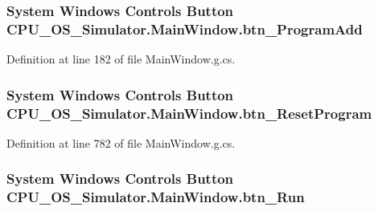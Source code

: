 \subsubsection[{btn\+\_\+\+Program\+Add}]{\setlength{\rightskip}{0pt plus 5cm}System Windows Controls Button C\+P\+U\+\_\+\+O\+S\+\_\+\+Simulator.\+Main\+Window.\+btn\+\_\+\+Program\+Add\hspace{0.3cm}{\ttfamily [package]}}\label{class_c_p_u___o_s___simulator_1_1_main_window_a4f0d9f8f3d56b76616367438d04b4fde}


Definition at line 182 of file Main\+Window.\+g.\+cs.

\hypertarget{class_c_p_u___o_s___simulator_1_1_main_window_ada16565fc869dea1d54013009f5892b4}{}
\subsubsection[{btn\+\_\+\+Reset\+Program}]{\setlength{\rightskip}{0pt plus 5cm}System Windows Controls Button C\+P\+U\+\_\+\+O\+S\+\_\+\+Simulator.\+Main\+Window.\+btn\+\_\+\+Reset\+Program\hspace{0.3cm}{\ttfamily [package]}}\label{class_c_p_u___o_s___simulator_1_1_main_window_ada16565fc869dea1d54013009f5892b4}


Definition at line 782 of file Main\+Window.\+g.\+cs.

\hypertarget{class_c_p_u___o_s___simulator_1_1_main_window_ab3286e931d7154605876654bbf092840}{}
\subsubsection[{btn\+\_\+\+Run}]{\setlength{\rightskip}{0pt plus 5cm}System Windows Controls Button C\+P\+U\+\_\+\+O\+S\+\_\+\+Simulator.\+Main\+Window.\+btn\+\_\+\+Run\hspace{0.3cm}{\ttfamily [package]}}\label{class_c_p_u___o_s___simulator_1_1_main_window_ab3286e931d7154605876654bbf092840}


